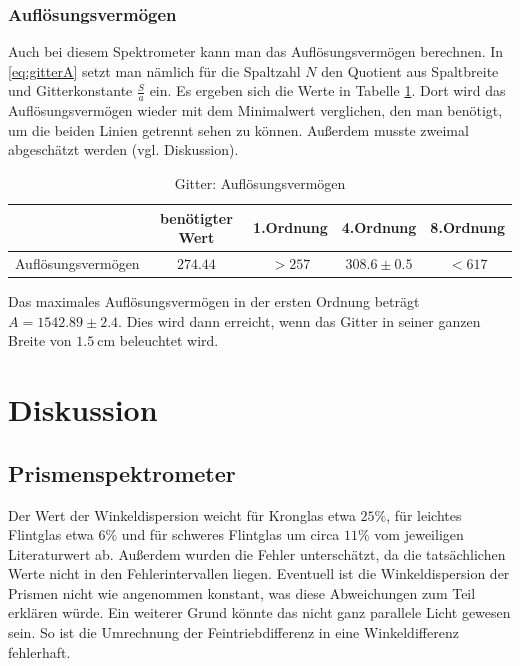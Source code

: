 \documentclass[12pt,a4paper,titlepage,headinclude,bibtotoc]{scrartcl}
\begin{document}
\subsubsection{Auflösungsvermögen}
Auch bei diesem Spektrometer kann man das Auflösungsvermögen berechnen.
In \eqref{eq:gitterA} setzt man nämlich für die Spaltzahl $N$ den Quotient aus Spaltbreite und Gitterkonstante $\frac{S}{a}$ ein.
Es ergeben sich die Werte in Tabelle \ref{tab:gitterA}.
Dort wird das Auflösungsvermögen wieder mit dem Minimalwert verglichen, den man benötigt, um die beiden Linien getrennt sehen zu können.
Außerdem musste zweimal abgeschätzt werden (vgl. Diskussion).\\
\begin{table}[!htb]
	\centering
	\begin{tabular}{|c|c|c|c|c|}
		\hline
		& benötigter Wert &1.Ordnung &  4.Ordnung & 8.Ordnung \\
		\hline
	    Auflösungsvermögen & $274.44$ & $>257$ & $308.6 \pm 0.5$ & $<617$ \\
		\hline
	\end{tabular}
	\caption{Gitter: Auflösungsvermögen}
	\label{tab:gitterA}
\end{table}

Das maximales Auflösungsvermögen in der ersten Ordnung beträgt $A=1542.89 \pm 2.4$.
Dies wird dann erreicht, wenn das Gitter in seiner ganzen Breite von $1.5~$cm beleuchtet wird.

\section{Diskussion}
\label{sec:diskussion}
\subsection{Prismenspektrometer}
Der Wert der Winkeldispersion weicht für Kronglas etwa $25\%$, für leichtes Flintglas etwa $6\%$ und für schweres Flintglas  um circa $11\%$ vom jeweiligen Literaturwert ab.
Außerdem wurden die Fehler unterschätzt, da die tatsächlichen Werte nicht in den Fehlerintervallen liegen.
Eventuell ist die Winkeldispersion der Prismen nicht wie angenommen konstant, was diese Abweichungen zum Teil erklären würde.
Ein weiterer Grund könnte das nicht ganz parallele Licht gewesen sein.
So ist die Umrechnung der Feintriebdifferenz in eine Winkeldifferenz fehlerhaft.\\
\end{document}
